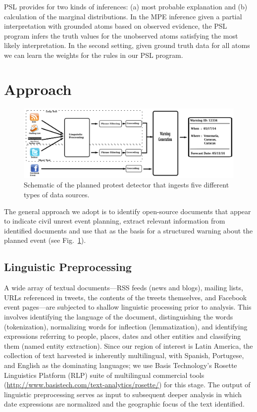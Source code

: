 \documentclass[letterpaper]{article}
\begin{document}
PSL provides for two kinds of inferences:
(a) most probable explanation and (b) calculation of the marginal distributions. 
In the MPE inference given a partial interpretation with grounded atoms based on observed evidence, the PSL program infers the truth values for the unobserved atoms satisfying the most likely interpretation. 
In the second setting, given ground truth data for all atoms we can learn the weights for the rules in our PSL program.

\vspace{-1em}
\section{Approach}
\begin{figure}
\includegraphics[width=\textwidth]{pipeline}
\vspace{-2em}
\caption{Schematic of the planned protest detector that ingests five
different types of data sources.}
\label{flowchart}
\end{figure}
The general approach we adopt is to identify open-source documents
that appear to indicate civil unrest event planning, extract
relevant information from identified documents and use that as the
basis for a structured warning about the planned event (see Fig.~\ref{flowchart}).
\vspace{-0.5em}
\subsection{Linguistic Preprocessing}
A wide array of textual documents---RSS feeds (news and blogs),
mailing lists, URLs referenced in tweets, the contents of the tweets themselves,
and Facebook event pages---are
subjected to shallow linguistic processing prior to analysis.  This
involves identifying the language of the document, distinguishing
the words (tokenization), normalizing words for inflection
(lemmatization), and identifying expressions referring to people,
places, dates and other entities and classifying them (named entity extraction). 
Since our region of interest is Latin America, the collection of text
harvested is inherently multilingual, with Spanish, Portugese, and English as
the dominating languages;
we use Basis Technology's Rosette Linguistics Platform (RLP) suite of multilingual commercial tools (\url{http://www.basistech.com/text-analytics/rosette/}) for this stage.
The output of linguistic preprocessing serves as input to subsequent deeper analysis in which 
date expressions are normalized and the geographic focus of the text identified.
\end{document}
